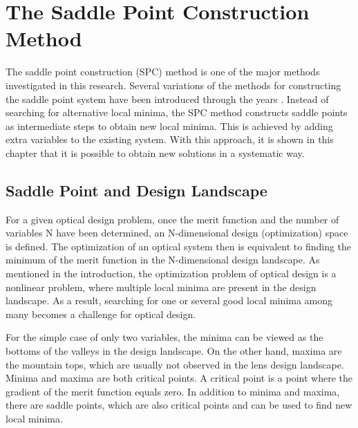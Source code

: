 \chapter{The Saddle Point Construction Method}
\label{chapter_SPC_method_reccomendation}
\graphicspath{ {./chapter-sp/figures/} }
\captionsetup[figure]{labelfont=bf}
\captionsetup{margin=1.5em}
\captionsetup[table]{labelfont=bf}





\noindent 
The saddle point construction (SPC) method is one of the major methods investigated in this research. Several variations of the methods for constructing the saddle point system have been introduced through the years \cite{BociortSPCSexplained}\cite{MVTurnhoutSPC15}\cite{HouProc2015}. Instead of searching for alternative local minima, the SPC method constructs saddle points as intermediate steps to obtain new local minima. This is achieved by adding extra variables to the existing system. With this approach, it is shown in this chapter that it is possible to obtain new solutions in a systematic way. 

\section{Saddle Point and Design Landscape}
For a given optical design problem, once the merit function and the number of variables N have been determined, an N-dimensional design (optimization) space is defined. The optimization of an optical system then is equivalent to finding the minimum of the merit function in the N-dimensional design landscape. As mentioned in the introduction, the optimization problem of optical design is a nonlinear problem, where multiple local minima are present in the design landscape. As a result, searching for one or several good local minima among many becomes a challenge for optical design. 

For the simple case of only two variables, the minima can be viewed as the bottoms of the valleys in the design landscape. On the other hand, maxima are the mountain tops, which are usually not observed in the lens design landscape. Minima and maxima are both critical points. A critical point is a point where the gradient of the merit function equals zero. In addition to minima and maxima, there are saddle points, which are also critical points and can be used to find new local minima.

